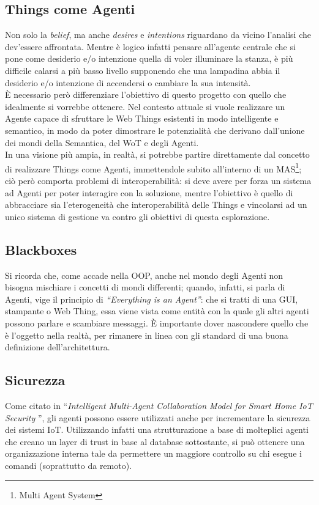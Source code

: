 \documentclass[12pt,a4paper,openright,oneside]{report}
\newcommand{\quotes}[1]{``#1''}
\begin{document}
\subsection{Things come Agenti}
\label{sec:agentthings}
Non solo la \textit{belief}, ma anche \textit{desires} e \textit{intentions} riguardano da vicino l'analisi che dev'essere affrontata. Mentre è logico infatti pensare all'agente centrale che si pone come desiderio e/o intenzione quella di voler illuminare la stanza, è più difficile calarsi a più basso livello supponendo che una lampadina abbia il desiderio e/o intenzione di accendersi o cambiare la sua intensità.\\

È necessario però differenziare l'obiettivo di questo progetto con quello che idealmente si vorrebbe ottenere. Nel contesto attuale si vuole realizzare un Agente capace di sfruttare le Web Things esistenti in modo intelligente e semantico, in modo da poter dimostrare le potenzialità che derivano dall'unione dei mondi della Semantica, del WoT e degli Agenti.\\

In una visione più ampia, in realtà, si potrebbe partire direttamente dal concetto di realizzare Things come Agenti, immettendole subito all'interno di un MAS\footnote{Multi Agent System}; ciò però comporta problemi di interoperabilità: si deve avere per forza un sistema ad Agenti per poter interagire con la soluzione, mentre l'obiettivo è quello di abbracciare sia l'eterogeneità che interoperabilità delle Things e vincolarsi ad un unico sistema di gestione va contro gli obiettivi di questa esplorazione.

\subsection{Blackboxes}
Si ricorda che, come accade nella OOP, anche nel mondo degli Agenti non bisogna mischiare i concetti di mondi differenti; quando, infatti, si parla di Agenti, vige il principio di \textit{\quotes{Everything is an Agent}}: che si tratti di una GUI, stampante o Web Thing, essa viene vista come entità con la quale gli altri agenti possono parlare e scambiare messaggi. È importante dover nascondere quello che è l'oggetto nella realtà, per rimanere in linea con gli standard di una buona definizione dell'architettura.\\

\subsection{Sicurezza}
Come citato in \quotes{\textit{Intelligent Multi-Agent Collaboration Model for Smart Home IoT Security} \cite{security}}, gli agenti possono essere utilizzati anche per incrementare la sicurezza dei sistemi IoT. Utilizzando infatti una strutturazione a base di molteplici agenti che creano un layer di trust in base al database sottostante, si può ottenere una organizzazione interna tale da permettere un maggiore controllo su chi esegue i comandi (soprattutto da remoto).\\
\end{document}
